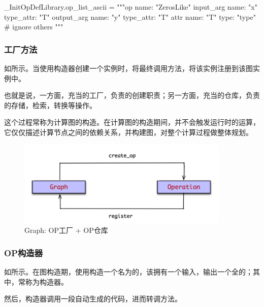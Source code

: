 \begin{content}
\begin{leftbar}
\begin{python}
_InitOpDefLibrary.op_list_ascii = """op {
  name: "ZerosLike"
  input_arg {
    name: "x"
    type_attr: "T"
  }
  output_arg {
    name: "y"
    type_attr: "T"
  }
  attr {
    name: "T"
    type: "type"
  }
}
# ignore others
"""
\end{python}
\end{leftbar}

\subsubsection{工厂方法}

如所示。当使用构造器创建一个实例时，将最终调用方法，将该实例注册到该图实例中。

也就是说，一方面，充当的工厂，负责的创建职责；另一方面，充当的仓库，负责的存储，检索，转换等操作。

这个过程常称为计算图的构造。在计算图的构造期间，并不会触发运行时的运算，它仅仅描述计算节点之间的依赖关系，并构建图，对整个计算过程做整体规划。

\begin{figure}[!htbp]
\centering
\includegraphics[width=0.9\textwidth]{figures/py-op-factory-and-repo.png}
\caption{Graph: OP工厂 + OP仓库}
 \label{fig:py-op-factory-and-repo}
\end{figure}

\subsubsection{OP构造器}

如所示。在图构造期，使用构造一个名为的，该拥有一个输入，输出一个全的；其中，常称为构造器。

然后，构造器调用一段自动生成的代码，进而转调方法。


\end{content}
